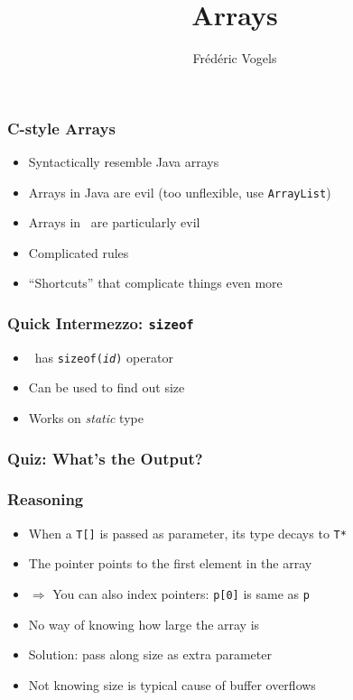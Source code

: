 \documentclass{../ucll-slides}
\title{Arrays}
\author{Fr\'ed\'eric Vogels}
\begin{document}
\begin{frame}
  \titlepage
\end{frame}

\begin{frame}
  \frametitle{C-style Arrays}
  \begin{itemize}
    \item Syntactically resemble Java arrays
    \item Arrays in Java are evil (too unflexible, use {\tt ArrayList})
    \item Arrays in \cpp\ are particularly evil
    \item Complicated rules
    \item ``Shortcuts'' that complicate things even more
  \end{itemize}
\end{frame}

\begin{frame}
  \frametitle{Quick Intermezzo: {\tt sizeof}}
  \begin{itemize}
    \item \cpp\ has {\tt sizeof({\it id})} operator
    \item Can be used to find out size
    \item Works on \emph{static} type
  \end{itemize}
\end{frame}

\begin{frame}
  \frametitle{Quiz: What's the Output?}
\end{frame}

\begin{frame}
  \frametitle{Reasoning}
  \begin{itemize}
    \item When a {\tt T[]} is passed as parameter, its type decays to {\tt T*}
    \item The pointer points to the first element in the array
    \item $\Rightarrow$ You can also index pointers: {\tt p[0]} is same as {\tt *p}
    \item No way of knowing how large the array is
    \item Solution: pass along size as extra parameter
    \item Not knowing size is typical cause of buffer overflows
  \end{itemize}
\end{frame}
\end{document}
